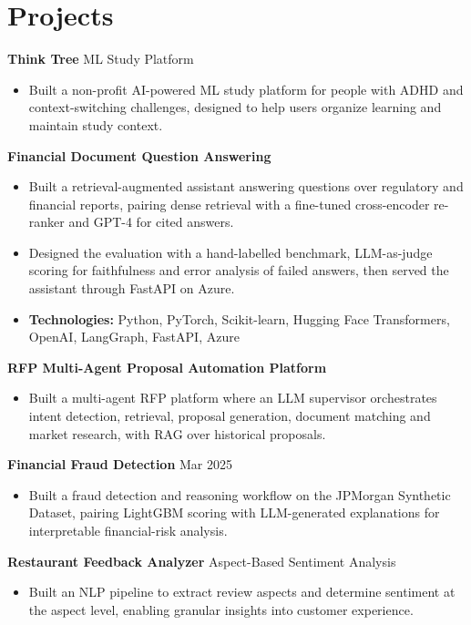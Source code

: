 \documentclass[10pt,a4paper]{article}
\begin{document}
\section{Projects}
\textbf{Think Tree} \textbar{} ML Study Platform\par
\begin{itemize}
  \item Built a non-profit AI-powered ML study platform for people with ADHD and context-switching challenges, designed to help users organize learning and maintain study context.
\end{itemize}
\textbf{Financial Document Question Answering}\par
\begin{itemize}
  \item Built a retrieval-augmented assistant answering questions over regulatory and financial reports, pairing dense retrieval with a fine-tuned cross-encoder re-ranker and GPT-4 for cited answers.
  \item Designed the evaluation with a hand-labelled benchmark, LLM-as-judge scoring for faithfulness and error analysis of failed answers, then served the assistant through FastAPI on Azure.
  \item \textbf{Technologies:} Python, PyTorch, Scikit-learn, Hugging Face Transformers, OpenAI, LangGraph, FastAPI, Azure
\end{itemize}
\textbf{RFP Multi-Agent Proposal Automation Platform}\par
\begin{itemize}
  \item Built a multi-agent RFP platform where an LLM supervisor orchestrates intent detection, retrieval, proposal generation, document matching and market research, with RAG over historical proposals.
\end{itemize}
\textbf{Financial Fraud Detection} \textbar{} Mar 2025\par
\begin{itemize}
  \item Built a fraud detection and reasoning workflow on the JPMorgan Synthetic Dataset, pairing LightGBM scoring with LLM-generated explanations for interpretable financial-risk analysis.
\end{itemize}
\textbf{Restaurant Feedback Analyzer} \textbar{} Aspect-Based Sentiment Analysis\par
\begin{itemize}
  \item Built an NLP pipeline to extract review aspects and determine sentiment at the aspect level, enabling granular insights into customer experience.
\end{itemize}
\end{document}
